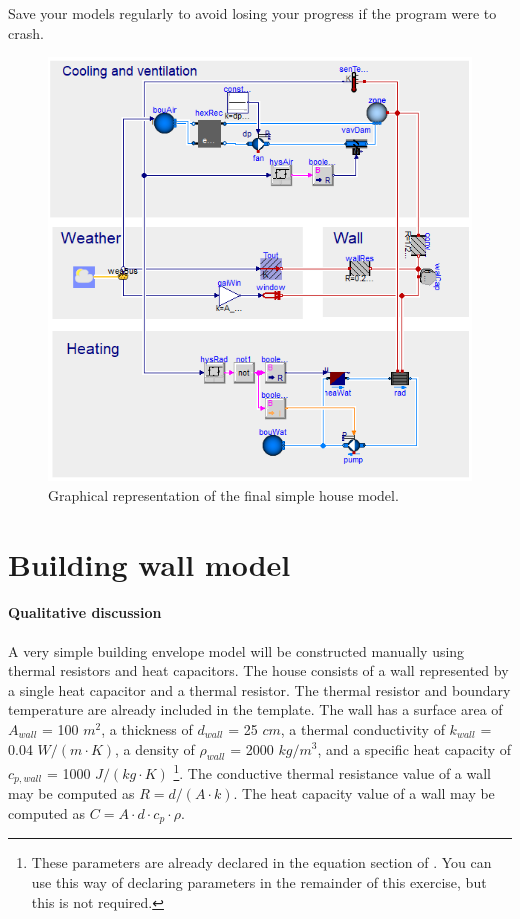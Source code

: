 \documentclass[10pt,a4paper]{article}
\begin{document}
Save your models regularly to avoid losing your progress if the program were to crash.

\begin{figure}
\centering
\includegraphics[width=0.8\columnwidth]{img/simpleHouse.png}
\caption{Graphical representation of the final simple house model.}
\label{fig:simpleHouse}
\end{figure}


\newpage
\section{Building wall model}
\paragraph{Qualitative discussion}
A very simple building envelope model will be constructed manually using thermal resistors and heat capacitors. The house consists of a wall represented by a single heat capacitor and a thermal resistor. The thermal resistor and boundary temperature are already included in the template. The wall has a surface area of $A_{wall}$ = 100 $m^2$, a thickness of $d_{wall}$ = 25 $cm$, a thermal conductivity of $k_{wall}$ = 0.04 $W/(m \cdot K)$, a density of $\rho_{wall}$ = 2000 $kg/m^3$, and a specific heat capacity of $c_{p,wall}$ = 1000 $J/(kg \cdot K)$ \footnote{These parameters are already declared in the equation section of . You can use this way of declaring parameters in the remainder of this exercise, but this is not required.}. The conductive thermal resistance value of a wall may be computed as $R=d/(A\cdot k)$.
The heat capacity value of a wall may be computed as $C=A\cdot d \cdot c_p \cdot \rho$.
\end{document}
